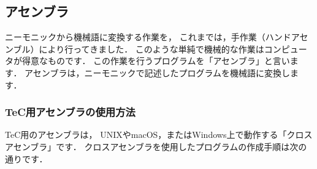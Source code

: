 \subsection{アセンブラ}

ニーモニックから機械語に変換する作業を，
これまでは，手作業（ハンドアセンブル）により行ってきました．
このような単純で機械的な作業はコンピュータが得意なものです．
この作業を行うプログラムを「アセンブラ」と言います．
アセンブラは，ニーモニックで記述したプログラムを機械語に変換します．

\subsubsection{TeC用アセンブラの使用方法}

TeC用のアセンブラは，
UNIXやmacOS，またはWindows上で動作する「クロスアセンブラ」です．
クロスアセンブラを使用したプログラムの作成手順は次の通りです．


